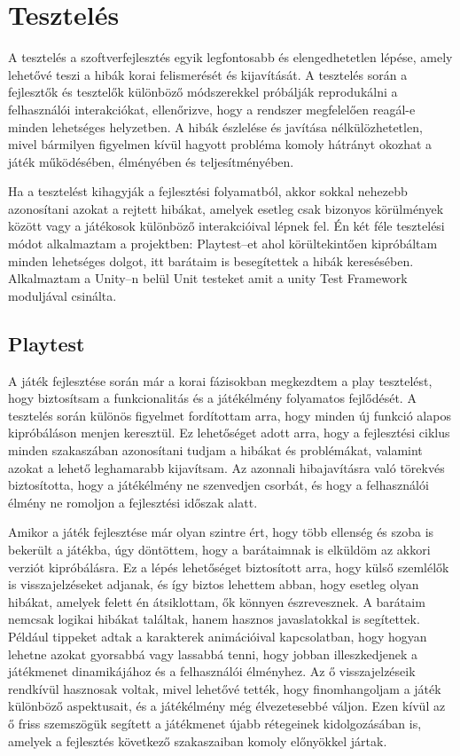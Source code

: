\documentclass[
]{thesis-ekf}
\theoremstyle{definition}
\theoremstyle{remark}
\begin{document}
\chapter{Tesztelés}
A tesztelés a szoftverfejlesztés egyik legfontosabb és elengedhetetlen lépése, amely lehetővé teszi a hibák korai felismerését és kijavítását. A tesztelés során a fejlesztők és tesztelők különböző módszerekkel próbálják reprodukálni a felhasználói interakciókat, ellenőrizve, hogy a rendszer megfelelően reagál-e minden lehetséges helyzetben. A hibák észlelése és javítása nélkülözhetetlen, mivel bármilyen figyelmen kívül hagyott probléma komoly hátrányt okozhat a játék működésében, élményében és teljesítményében.

Ha a tesztelést kihagyják a fejlesztési folyamatból, akkor sokkal nehezebb azonosítani azokat a rejtett hibákat, amelyek esetleg csak bizonyos körülmények között vagy a játékosok különböző interakcióival lépnek fel. 
Én két féle tesztelési módot alkalmaztam a projektben: Playtest--et ahol körültekintően kipróbáltam minden lehetséges dolgot, itt barátaim is besegítettek a hibák keresésében. Alkalmaztam a Unity--n belül Unit testeket amit a unity Test Framework moduljával csinálta.
\section{Playtest}
A játék fejlesztése során már a korai fázisokban megkezdtem a play tesztelést, hogy biztosítsam a funkcionalitás és a játékélmény folyamatos fejlődését. A tesztelés során különös figyelmet fordítottam arra, hogy minden új funkció alapos kipróbáláson menjen keresztül. Ez lehetőséget adott arra, hogy a fejlesztési ciklus minden szakaszában azonosítani tudjam a hibákat és problémákat, valamint azokat a lehető leghamarabb kijavítsam. Az azonnali hibajavításra való törekvés biztosította, hogy a játékélmény ne szenvedjen csorbát, és hogy a felhasználói élmény ne romoljon a fejlesztési időszak alatt.

Amikor a játék fejlesztése már olyan szintre ért, hogy több ellenség és szoba is bekerült a játékba, úgy döntöttem, hogy a barátaimnak is elküldöm az akkori verziót kipróbálásra. Ez a lépés lehetőséget biztosított arra, hogy külső szemlélők is visszajelzéseket adjanak, és így biztos lehettem abban, hogy esetleg olyan hibákat, amelyek felett én átsiklottam, ők könnyen észrevesznek. A barátaim nemcsak logikai hibákat találtak, hanem hasznos javaslatokkal is segítettek. Például tippeket adtak a karakterek animációival kapcsolatban, hogy hogyan lehetne azokat gyorsabbá vagy lassabbá tenni, hogy jobban illeszkedjenek a játékmenet dinamikájához és a felhasználói élményhez. Az ő visszajelzéseik rendkívül hasznosak voltak, mivel lehetővé tették, hogy finomhangoljam a játék különböző aspektusait, és a játékélmény még élvezetesebbé váljon. Ezen kívül az ő friss szemszögük segített a játékmenet újabb rétegeinek kidolgozásában is, amelyek a fejlesztés következő szakaszaiban komoly előnyökkel jártak.
\end{document}
